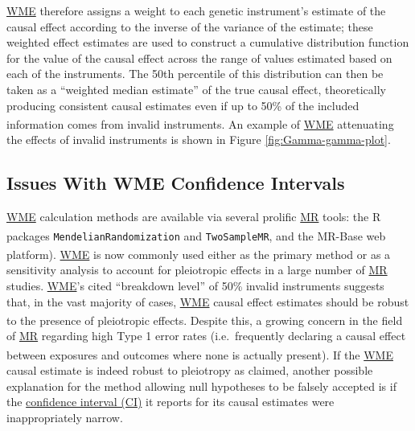 \documentclass[
]{article}
\begin{document}
\hyperref[acronyms_WME]{WME} therefore assigns a weight to each genetic instrument's estimate of the causal effect according to the inverse of the variance of the estimate; these weighted effect estimates are used to construct a cumulative distribution function for the value of the causal effect across the range of values estimated based on each of the instruments. The 50th percentile of this distribution can then be taken as a ``weighted median estimate'' of the true causal effect, theoretically producing consistent causal estimates even if up to 50\% of the included information comes from invalid instruments\textsuperscript{}. An example of \hyperref[acronyms_WME]{WME} attenuating the effects of invalid instruments is shown in Figure \ref{fig:Gamma-gamma-plot}.

\subsection{Issues With WME Confidence Intervals}\label{issues-with-wme-confidence-intervals}

\hyperref[acronyms_WME]{WME} calculation methods are available via several prolific \hyperref[acronyms_MR]{MR} tools: the R packages \texttt{MendelianRandomization}\textsuperscript{} and \texttt{TwoSampleMR}, and the MR-Base web platform\textsuperscript{}). \hyperref[acronyms_WME]{WME} is now commonly used either as the primary method or as a sensitivity analysis to account for pleiotropic effects in a large number of \hyperref[acronyms_MR]{MR} studies. \hyperref[acronyms_WME]{WME}'s cited ``breakdown level'' of 50\% invalid instruments suggests that, in the vast majority of cases, \hyperref[acronyms_WME]{WME} causal effect estimates should be robust to the presence of pleiotropic effects\textsuperscript{}. Despite this, a growing concern in the field of \hyperref[acronyms_MR]{MR} regarding high Type 1 error rates (i.e.~frequently declaring a causal effect between exposures and outcomes where none is actually present)\textsuperscript{}. If the \hyperref[acronyms_WME]{WME} causal estimate is indeed robust to pleiotropy as claimed, another possible explanation for the method allowing null hypotheses to be falsely accepted is if the \hyperref[acronyms_CI]{confidence interval (CI)} it reports for its causal estimates were inappropriately narrow.
\end{document}
